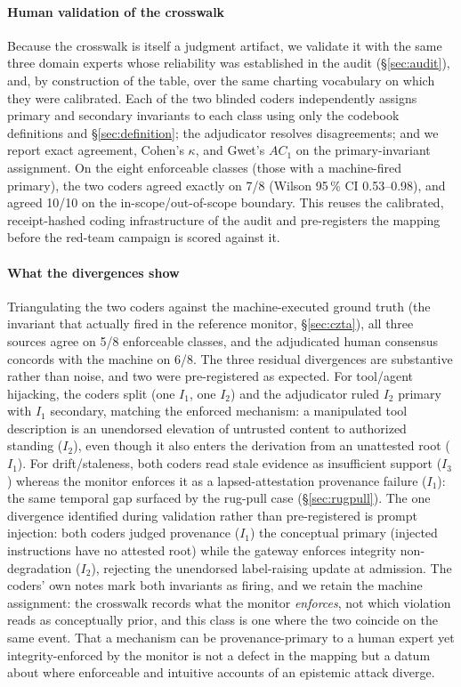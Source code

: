 \documentclass[conference]{IEEEtran}
\newcommand{\Ione}{\ensuremath{I_1}}
\newcommand{\Itwo}{\ensuremath{I_2}}
\newcommand{\Ithree}{\ensuremath{I_3}}
\begin{document}
\paragraph*{Human validation of the crosswalk}
Because the crosswalk is itself a judgment artifact, we validate
it with the same three domain experts whose reliability was
established in the audit (\S\ref{sec:audit}), and, by
construction of the table, over the same charting vocabulary on
which they were calibrated. Each of the two blinded coders
independently assigns primary and secondary invariants to each
class using only the codebook definitions and
\S\ref{sec:definition}; the adjudicator resolves disagreements;
and we report exact agreement, Cohen's $\kappa$, and Gwet's $AC_1$
on the primary-invariant assignment. On the eight enforceable
classes (those with a machine-fired primary), the two coders
agreed exactly on 7/8 (Wilson 95\,\% CI 0.53--0.98), and agreed 10/10 on
the in-scope/out-of-scope boundary. This reuses the calibrated,
receipt-hashed coding infrastructure of the audit and
pre-registers the mapping before the red-team campaign is scored
against it.

\paragraph*{What the divergences show}
Triangulating the two coders against the machine-executed ground
truth (the invariant that actually fired in the reference monitor,
\S\ref{sec:czta}), all three sources agree on 5/8 enforceable
classes, and the adjudicated human consensus concords with the
machine on 6/8. The three residual divergences are substantive
rather than noise, and two were pre-registered as expected. For
tool/agent hijacking, the coders split (one \Ione, one \Itwo) and
the adjudicator ruled \Itwo{} primary with \Ione{} secondary,
matching the enforced mechanism: a manipulated tool description is
an unendorsed elevation of untrusted content to authorized
standing (\Itwo), even though it also enters the derivation from
an unattested root (\Ione). For drift/staleness, both coders read
stale evidence as insufficient support (\Ithree) whereas the
monitor enforces it as a lapsed-attestation provenance failure
(\Ione): the same temporal gap surfaced by the rug-pull case
(\S\ref{sec:rugpull}). The one divergence identified during
validation rather than pre-registered is prompt injection: both
coders judged provenance (\Ione) the conceptual primary (injected
instructions have no attested root) while the gateway enforces
integrity non-degradation (\Itwo), rejecting the unendorsed
label-raising update at admission. The coders' own notes mark both
invariants as firing, and we retain the machine assignment: the
crosswalk records what the monitor \emph{enforces}, not which
violation reads as conceptually prior, and this class is
one where the two coincide on the same event. That a mechanism can
be provenance-primary to a human expert yet integrity-enforced by
the monitor is not a defect in the mapping but a datum about where
enforceable and intuitive accounts of an epistemic attack diverge.
\end{document}
